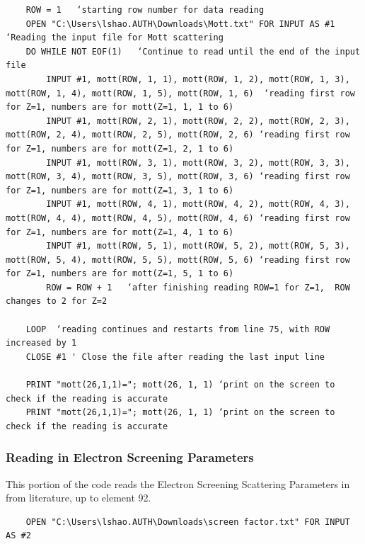 \documentclass[10pt, reqno]{exam}
\begin{document}
{\begin{verbatim}
    ROW = 1   ‘starting row number for data reading
    OPEN "C:\Users\lshao.AUTH\Downloads\Mott.txt" FOR INPUT AS #1 ‘Reading the input file for Mott scattering
    DO WHILE NOT EOF(1)   ‘Continue to read until the end of the input file
        INPUT #1, mott(ROW, 1, 1), mott(ROW, 1, 2), mott(ROW, 1, 3), mott(ROW, 1, 4), mott(ROW, 1, 5), mott(ROW, 1, 6)  ‘reading first row for Z=1, numbers are for mott(Z=1, 1, 1 to 6)
        INPUT #1, mott(ROW, 2, 1), mott(ROW, 2, 2), mott(ROW, 2, 3), mott(ROW, 2, 4), mott(ROW, 2, 5), mott(ROW, 2, 6) ‘reading first row for Z=1, numbers are for mott(Z=1, 2, 1 to 6)
        INPUT #1, mott(ROW, 3, 1), mott(ROW, 3, 2), mott(ROW, 3, 3), mott(ROW, 3, 4), mott(ROW, 3, 5), mott(ROW, 3, 6) ‘reading first row for Z=1, numbers are for mott(Z=1, 3, 1 to 6)
        INPUT #1, mott(ROW, 4, 1), mott(ROW, 4, 2), mott(ROW, 4, 3), mott(ROW, 4, 4), mott(ROW, 4, 5), mott(ROW, 4, 6) ‘reading first row for Z=1, numbers are for mott(Z=1, 4, 1 to 6)
        INPUT #1, mott(ROW, 5, 1), mott(ROW, 5, 2), mott(ROW, 5, 3), mott(ROW, 5, 4), mott(ROW, 5, 5), mott(ROW, 5, 6) ‘reading first row for Z=1, numbers are for mott(Z=1, 5, 1 to 6)
        ROW = ROW + 1   ‘after finishing reading ROW=1 for Z=1,  ROW changes to 2 for Z=2
    
    LOOP  ‘reading continues and restarts from line 75, with ROW increased by 1
    CLOSE #1 ' Close the file after reading the last input line

    PRINT "mott(26,1,1)="; mott(26, 1, 1) ‘print on the screen to check if the reading is accurate
    PRINT "mott(26,1,1)="; mott(26, 1, 1) ‘print on the screen to check if the reading is accurate
\end{verbatim}
\subsubsection{Reading in Electron Screening Parameters}

This portion of the code reads the Electron Screening Scattering Parameters in from literature, up to element 92. \par

\vspace{0.5 cm}

\begin{verbatim}
    OPEN "C:\Users\lshao.AUTH\Downloads\screen factor.txt" FOR INPUT AS #2
\end{verbatim}

}
\end{document}
